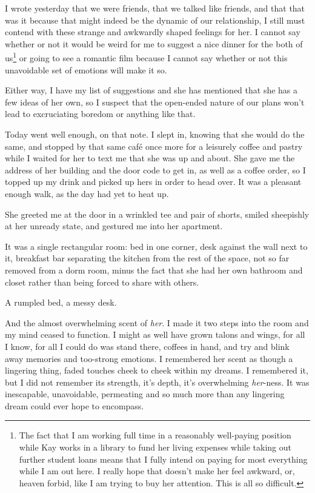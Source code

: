 I wrote yesterday that we were friends, that we talked like friends, and that that was it because that might indeed be the dynamic of our relationship, I still must contend with these strange and awkwardly shaped feelings for her. I cannot say whether or not it would be weird for me to suggest a nice dinner for the both of us\footnote{The fact that I am working full time in a reasonably well-paying position while Kay works in a library to fund her living expenses while taking out further student loans means that I fully intend on paying for most everything while I am out here. I really hope that doesn't make her feel awkward, or, heaven forbid, like I am trying to buy her attention. This is all so difficult.} or going to see a romantic film because I cannot say whether or not this unavoidable set of emotions will make it so.

Either way, I have my list of suggestions and she has mentioned that she has a few ideas of her own, so I suspect that the open-ended nature of our plans won't lead to excruciating boredom or anything like that.

Today went well enough, on that note. I slept in, knowing that she would do the same, and stopped by that same café once more for a leisurely coffee and pastry while I waited for her to text me that she was up and about. She gave me the address of her building and the door code to get in, as well as a coffee order, so I topped up my drink and picked up hers in order to head over. It was a pleasant enough walk, as the day had yet to heat up.

She greeted me at the door in a wrinkled tee and pair of shorts, smiled sheepishly at her unready state, and gestured me into her apartment.

It was a single rectangular room: bed in one corner, desk against the wall next to it, breakfast bar separating the kitchen from the rest of the space, not so far removed from a dorm room, minus the fact that she had her own bathroom and closet rather than being forced to share with others.

A rumpled bed, a messy desk.

And the almost overwhelming scent of \emph{her}. I made it two steps into the room and my mind ceased to function. I might as well have grown talons and wings, for all I know, for all I could do was stand there, coffees in hand, and try and blink away memories and too-strong emotions. I remembered her scent as though a lingering thing, faded touches cheek to cheek within my dreams. I remembered it, but I did not remember its strength, it's depth, it's overwhelming \emph{her}-ness. It was inescapable, unavoidable, permeating and so much more than any lingering dream could ever hope to encompass.

